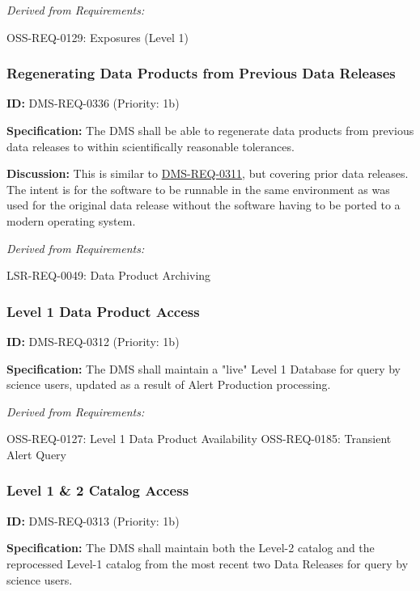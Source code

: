 \documentclass[SE,toc,lsstdraft]{lsstdoc}
\begin{document}
\emph{Derived from Requirements:}

OSS-REQ-0129:
Exposures (Level 1) \newline

\subsubsection{Regenerating Data Products from Previous Data Releases}

\label{DMS-REQ-0336}
\textbf{ID:} DMS-REQ-0336 (Priority: 1b)

\textbf{Specification:} The DMS shall be able to regenerate data products from previous data releases to within scientifically reasonable tolerances.

\textbf{Discussion:} This is similar to \hyperref[DMS-REQ-0311]{DMS-REQ-0311}, but covering prior data releases. The intent is for the software to be runnable in the same environment as was used for the original data release without the software having to be ported to a modern operating system.

\emph{Derived from Requirements:}

LSR-REQ-0049:
Data Product Archiving \newline

\subsubsection{Level 1 Data Product Access}

\label{DMS-REQ-0312}
\textbf{ID:} DMS-REQ-0312 (Priority: 1b)

\textbf{Specification:} The DMS shall maintain a "live" Level 1 Database for query by science users, updated as a result of Alert Production processing.

\emph{Derived from Requirements:}

OSS-REQ-0127:
Level 1 Data Product Availability \newline
OSS-REQ-0185:
Transient Alert Query \newline

\subsubsection{Level 1 \& 2 Catalog Access}

\label{DMS-REQ-0313}
\textbf{ID:} DMS-REQ-0313 (Priority: 1b)

\textbf{Specification:} The DMS shall maintain both the Level-2 catalog and the reprocessed Level-1 catalog from the most recent two Data Releases for query by science users.
\end{document}
